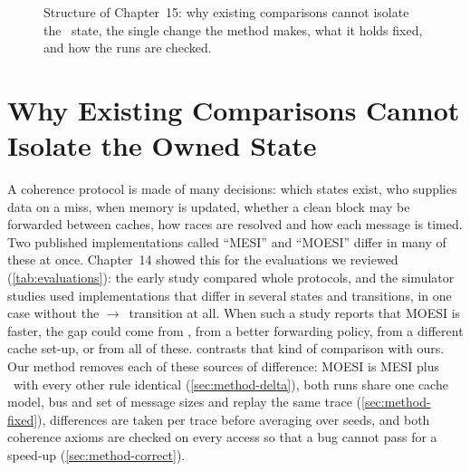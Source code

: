 \begin{figure}[htbp]
\centering
{}
\caption[]{Structure of Chapter~15: why existing
comparisons cannot isolate the \stO\ state, the single change the method makes,
what it holds fixed, and how the runs are checked.}
\label{fig:ch15-map}
\end{figure}

\section{Why Existing Comparisons Cannot Isolate the Owned State}
\label{sec:method-why}
%

A coherence protocol is made of many decisions: which states exist, who supplies
data on a miss, when memory is updated, whether a clean block may be forwarded
between caches, how races are resolved and how each message is timed. Two
published implementations called ``MESI'' and ``MOESI'' differ in many of these at
once. Chapter~14 showed this for the evaluations we reviewed
(\cref{tab:evaluations}): the early study compared whole protocols, and the
simulator studies used implementations that differ in several states and
transitions, in one case without the \stM$\to$\stO\ transition at all. When such a
study reports that MOESI is faster, the gap could come from \stO, from a better
forwarding policy, from a different cache set-up, or from all of these.
 contrasts that kind of comparison with ours. Our method
removes each of these sources of difference: MOESI is MESI plus \stO\ with every
other rule identical (\cref{sec:method-delta}), both runs share one cache model, bus
and set of message sizes and replay the same trace (\cref{sec:method-fixed}),
differences are taken per trace before averaging over seeds, and both coherence
axioms are checked on every access so that a bug cannot pass for a speed-up
(\cref{sec:method-correct}).

